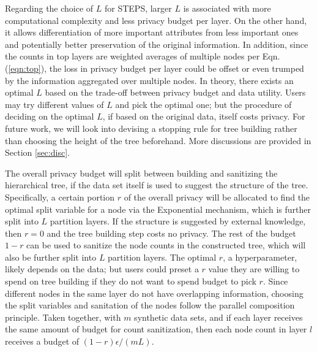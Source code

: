 \documentclass[12pt, A4]{article}
\theoremstyle{plain}
\theoremstyle{exampstyle}\newtheorem{defn}{Definition}
\theoremstyle{exampstyle}\newtheorem{lem}{Lemma}
\theoremstyle{exampstyle}\newtheorem{cor}{Corollary}
\theoremstyle{exampstyle}\newtheorem{pro}{Proposition}
\theoremstyle{exampstyle}\newtheorem{cla}{Claim}
\theoremstyle{exampstyle}\newtheorem{rem}{Remark}
\begin{document}
Regarding the choice of $L$ for STEPS, larger $L$ is associated with more computational complexity and less privacy budget per layer. On the other hand, it allows differentiation of more important attributes from less important ones and potentially better preservation of the original information. In addition, since the counts in top layers are weighted averages of multiple nodes per Eqn. (\ref{eqn:top}), the loss in privacy budget per layer could be offset or even trumped by the information aggregated over multiple nodes. In theory, there exists an optimal $L$  based on the trade-off between privacy budget and data utility. Users may try different values of $L$ and pick the optimal one; but the procedure of deciding on the optimal $L$, if based on the original data, itself costs privacy. For future work, we will look into devising a stopping rule for tree building rather than choosing the height of the tree beforehand. More discussions are provided in Section \ref{sec:disc}.

The overall privacy budget will split between building and sanitizing the hierarchical tree, if the data set itself is used to suggest the structure of the tree. Specifically, a certain portion $r$ of the overall privacy will be allocated to find the optimal split variable for a node via the Exponential mechanism, which is further split into $L$ partition layers.  If the structure is suggested by external knowledge, then $r=0$ and the tree building step costs no privacy. The rest of the budget $1-r$ can be used to sanitize the node counts in the constructed tree, which will also be further split into $L$ partition layers. The optimal $r$, a hyperparameter, likely depends on the data; but users could preset a $r$ value they are willing to spend on tree building if they do not want to spend budget to pick $r$. Since different nodes in the same layer do not have overlapping information, choosing the split variables and sanitation of the nodes follow the parallel composition principle. Taken together, with $m$ synthetic data sets, and if each layer receives the same amount of budget for count sanitization, then each node count in layer $l$ receives a budget of $(1-r)\epsilon/(mL)$.
\end{document}
